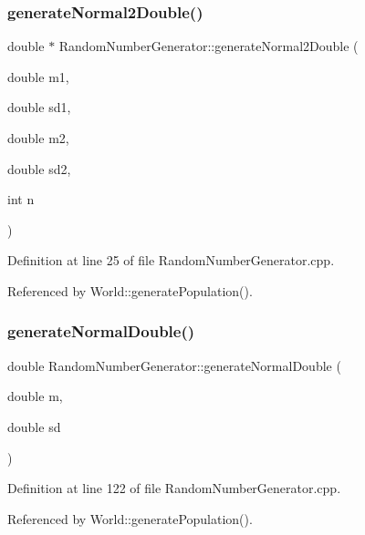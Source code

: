 \mbox{\label{class_random_number_generator_a15aca1c8c686a9e084e7d9e56bb0f9b4}} 
\subsubsection{generate\+Normal2\+Double()}
{\footnotesize\ttfamily double $\ast$ Random\+Number\+Generator\+::generate\+Normal2\+Double (\begin{DoxyParamCaption}\item[{double}]{m1,  }\item[{double}]{sd1,  }\item[{double}]{m2,  }\item[{double}]{sd2,  }\item[{int}]{n }\end{DoxyParamCaption})}



Definition at line 25 of file Random\+Number\+Generator.\+cpp.



Referenced by World\+::generate\+Population().

\mbox{\label{class_random_number_generator_a9ba1eb0363e94b437c9cf8b157331d1a}} 
\subsubsection{generate\+Normal\+Double()\hspace{0.1cm}{\footnotesize\ttfamily [1/2]}}
{\footnotesize\ttfamily double Random\+Number\+Generator\+::generate\+Normal\+Double (\begin{DoxyParamCaption}\item[{double}]{m,  }\item[{double}]{sd }\end{DoxyParamCaption})}



Definition at line 122 of file Random\+Number\+Generator.\+cpp.



Referenced by World\+::generate\+Population().

